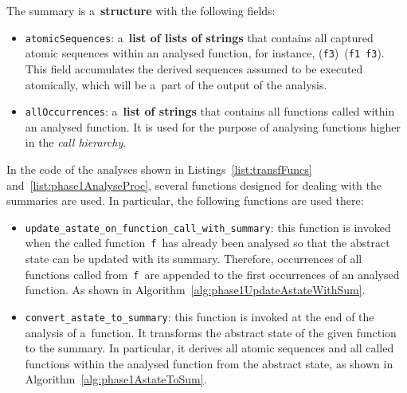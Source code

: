 The summary is a~\textbf{structure} with the following fields:
\begin{itemize}
    \item
        \texttt{atomicSequences}: a~\textbf{list of lists of strings}
        that contains all captured atomic sequences within an analysed 
        function, for instance, (\texttt{f3})~(\texttt{f1}~\texttt{f3}). 
        This field accumulates the derived sequences assumed to be executed
        atomically, which will be a~part of the output of the analysis.

    \item
        \texttt{allOccurrences}: a~\textbf{list of strings} that contains 
        all functions called within an analysed function. It is used for 
        the purpose of analysing functions higher in the \emph{call 
        hierarchy}.
\end{itemize}

In the code of the analyses shown in Listings~\ref{list:transfFuncs} 
and~\ref{list:phase1AnalyseProc}, several functions designed for dealing 
with the summaries are used. In particular, the following functions are 
used there:
\begin{itemize}
    \item
        \texttt{update\_astate\_on\_function\_call\_with\_summary}: this
        function is invoked when the called function~\texttt{f}~has already 
        been analysed so that the abstract state can be updated with its
        summary. Therefore, occurrences of all functions called 
        from~\texttt{f}~are appended to the first occurrences of an 
        analysed function. As shown in
        Algorithm~\ref{alg:phase1UpdateAstateWithSum}.

    \item
        \texttt{convert\_astate\_to\_summary}: this function is invoked 
        at the end of the analysis of a~function. It transforms the abstract
        state of the given function to the summary. In particular, it
        derives all atomic sequences and all called functions within the
        analysed function from the abstract state, as shown in
        Algorithm~\ref{alg:phase1AstateToSum}.
\end{itemize}

\begin{algorithm}[hbt]


    \caption{%
        Updating abstract state with the summary of a~called function
    }
    \label{alg:phase1UpdateAstateWithSum}
\end{algorithm}

